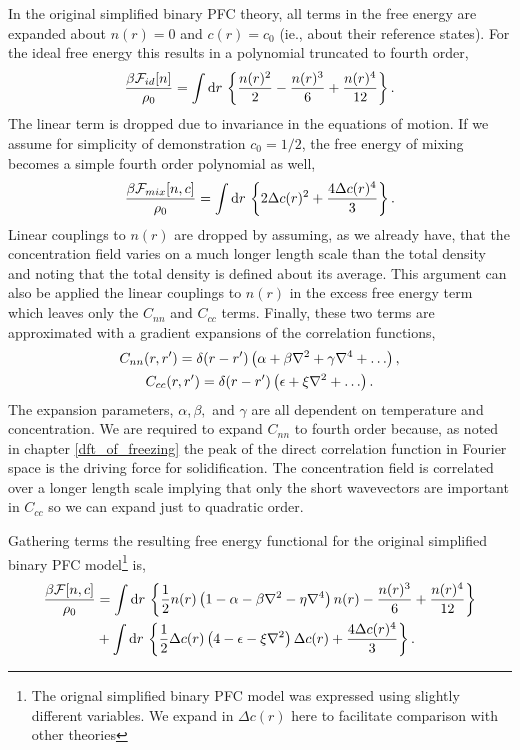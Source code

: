 In the original simplified binary PFC theory, all terms in the free energy are
expanded about $n(r) = 0$ and $c(r) = c_0$ (ie., about their reference states).
For the ideal free energy this results in a polynomial truncated to fourth
order,
%
\begin{equation}
    \label{ideal_expansion}
    \frac{\beta\mathcal{F}_{id}[n]}{\rho_0} = \int \mathrm{d}r\,
    \left\lbrace \frac{n(r)^2}{2} - \frac{n(r)^3}{6} + \frac{n(r)^4}{12} \right\rbrace.
\end{equation}
%
The linear term is dropped due to invariance in the equations of motion. If we
assume for simplicity of demonstration $c_0 = 1/2$, the free energy of mixing
becomes a simple fourth order polynomial as well,
%
\begin{equation}
    \frac{\beta\mathcal{F}_{mix}[n, c]}{\rho_0} = \int \mathrm{d}r\, \left\lbrace
       2\Delta c(r)^2 + \frac{4\Delta c(r)^4}{3}
    \right\rbrace.
\end{equation}
%
Linear couplings to $n(r)$ are dropped by assuming, as we already have, that
the concentration field varies on a much longer length scale than the total
density and noting that the total density is defined about its average. This
argument can also be applied the linear couplings to $n(r)$ in the excess free
energy term which leaves only the $C_{nn}$ and $C_{cc}$ terms. Finally, these
two terms are approximated with a gradient expansions of the correlation
functions,
%
\begin{gather}
    C_{nn}(r, r^\prime) = \d(r - r^\prime)\l(
        \alpha + \beta \nabla^2 + \gamma \nabla^4 + \dots\r), \\
    C_{cc}(r, r^\prime) = \d(r - r^\prime)\l(
        \epsilon + \xi \nabla^2 + \dots\r).
\end{gather}
%
The expansion parameters, $\alpha, \beta,$ and $\gamma$ are all dependent on
temperature and concentration. We are required to expand $C_{nn}$ to fourth
order because, as noted in chapter \ref{dft_of_freezing} the peak of the direct
correlation function in Fourier space is the driving force for solidification.
The concentration field is correlated over a longer length scale implying that
only the short wavevectors are important in $C_{cc}$ so we can expand just to
quadratic order.

Gathering terms the resulting free energy functional for the original simplified
binary PFC model\footnote{The orignal simplified binary PFC model was
expressed using slightly different variables. We expand in $\Delta c(r)$ here to 
facilitate comparison with other theories} is,
%
\begin{align}
    \frac{\beta\mathcal{F}[n, c]}{\rho_0} &= \int \mathrm{d}r\, \left\lbrace 
        \frac{1}{2} n(r) \left( 1 - \alpha - \beta\nabla^2 - \eta\nabla^4 \right) n(r)
      - \frac{n(r)^3}{6} + \frac{n(r)^4}{12} \right\rbrace \\
    &+ \int \mathrm{d}r\, \left\lbrace
        \frac{1}{2} \Delta c(r) \left( 4 - \epsilon - \xi\nabla^2 \right) \Delta c(r) 
      + \frac{4 \Delta c(r)^4}{3} \right\rbrace. \nonumber
\end{align}
%

